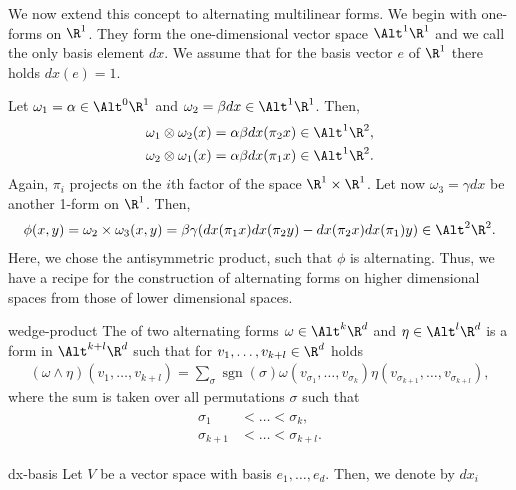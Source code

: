 \begin{intro}
  We now extend this concept to alternating multilinear forms. We
  begin with one-forms on $\R^1$. They form the one-dimensional vector
  space $\Alt^1\R^1$ and we call the only basis element $dx$. We
  assume that for the basis vector $e$ of $\R^1$ there holds $dx(e) = 1$.

  Let $\omega_1 = \alpha \in \Alt^0\R^1$ and
  $\omega_2 = \beta dx \in\Alt^1\R^1$. Then,
  \begin{gather*}
    \begin{split}
          \omega_1\otimes\omega_2 (x) &= \alpha\beta dx(\pi_2x) \in\Alt^1\R^2,
          \\
          \omega_2\otimes\omega_1 (x) &= \alpha\beta dx(\pi_1x) \in\Alt^1\R^2.
    \end{split}
  \end{gather*}
  Again, $\pi_i$ projects on the $i$th factor of the space
  $\R^1\times \R^1$. Let now $\omega_3 = \gamma dx$ be another 1-form
  on $\R^1$. Then,
  \begin{gather}
    \phi(x,y) = \omega_2\times \omega_3(x,y) = \beta\gamma (dx(\pi_1 x)
    dx(\pi_2 y) - dx(\pi_2 x) dx(\pi_1)y) \in \Alt^2\R^2.
  \end{gather}
  Here, we chose the antisymmetric product, such that $\phi$ is
  alternating. Thus, we have a recipe for the construction of
  alternating forms on higher dimensional spaces from those of lower
  dimensional spaces.
\end{intro}


\begin{Definition}{wedge-product}
  The  of two alternating forms
  $\omega\in \Alt^k\R^d$ and $\eta\in\Alt^l\R^d$ is a form in $\Alt^{k+l}\R^d$ such that for
  $v_1,\dots,v_{k+l}\in\R^d$ holds
  \begin{gather}
    (\omega\wedge\eta)(v_1,\dots,v_{k+l})
    = \sum_{\sigma} \operatorname{sgn}(\sigma) \omega(v_{\sigma_1},\dots,v_{\sigma_k})
    \eta(v_{\sigma_{k+1}},\dots,v_{\sigma_{k+l}}),
  \end{gather}
  where the sum is taken over all permutations $\sigma$ such that
  \begin{gather*}
    \begin{split}
      \sigma_1 &< \dots < \sigma_k,\\
      \sigma_{k+1} & < \dots < \sigma_{k+l}.
    \end{split}
  \end{gather*}
\end{Definition}

\begin{Notation}{dx-basis}
  Let $V$ be a vector space with basis $e_1,\dots,e_d$. Then, we denote by $dx_i$
\end{Notation}
